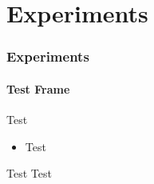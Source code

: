\section{Experiments}
\begin{frame}
	\frametitle{Experiments}
	\framesubtitle{Test Frame}
	Test
	\begin{itemize}
		\item Test
	\end{itemize}
	\begin{block}{Test}
		Test
	\end{block}
\end{frame}

